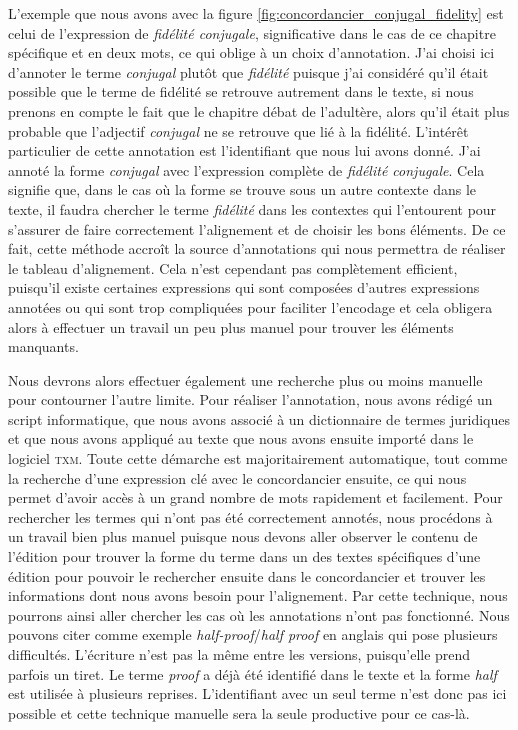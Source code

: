 L’exemple que nous avons avec la figure \ref{fig:concordancier_conjugal_fidelity} est celui de l’expression de \textit{fidélité conjugale}, significative dans le cas de ce chapitre spécifique et en deux mots, ce qui oblige à un choix d’annotation. J’ai choisi ici d’annoter le terme \textit{conjugal} plutôt que \textit{fidélité} puisque j’ai considéré qu’il était possible que le terme de fidélité se retrouve autrement dans le texte, si nous prenons en compte le fait que le chapitre débat de l’adultère, alors qu’il était plus probable que l’adjectif \textit{conjugal} ne se retrouve que lié à la fidélité. L’intérêt particulier de cette annotation est l’identifiant que nous lui avons donné. J’ai annoté la forme \textit{conjugal} avec l’expression complète de \textit{fidélité conjugale}. Cela signifie que, dans le cas où la forme se trouve sous un autre contexte dans le texte, il faudra chercher le terme \textit{fidélité} dans les contextes qui l’entourent pour s’assurer de faire correctement l’alignement et de choisir les bons éléments. De ce fait, cette méthode accroît la source d’annotations qui nous permettra de réaliser le tableau d’alignement. Cela n’est cependant pas complètement efficient, puisqu’il existe certaines expressions qui sont composées d’autres expressions annotées ou qui sont trop compliquées pour faciliter l’encodage et cela obligera alors à effectuer un travail un peu plus manuel pour trouver les éléments manquants.

Nous devrons alors effectuer également une recherche plus ou moins manuelle pour contourner l’autre limite. Pour réaliser l’annotation, nous avons rédigé un script informatique, que nous avons associé à un dictionnaire de termes juridiques et que nous avons appliqué au texte que nous avons ensuite importé dans le logiciel \textsc{txm}. Toute cette démarche est majoritairement automatique, tout comme la recherche d’une expression clé avec le concordancier ensuite, ce qui nous permet d’avoir accès à un grand nombre de mots rapidement et facilement. Pour rechercher les termes qui n’ont pas été correctement annotés, nous procédons à un travail bien plus manuel puisque nous devons aller observer le contenu de l’édition pour trouver la forme du terme dans un des textes spécifiques d’une édition pour pouvoir le rechercher ensuite dans le concordancier et trouver les informations dont nous avons besoin pour l’alignement. Par cette technique, nous pourrons ainsi aller chercher les cas où les annotations n’ont pas fonctionné. Nous pouvons citer comme exemple \textit{half-proof}/\textit{half proof} en anglais qui pose plusieurs difficultés. L’écriture n’est pas la même entre les versions, puisqu’elle prend parfois un tiret. Le terme \textit{proof} a déjà été identifié dans le texte et la forme \textit{half} est utilisée à plusieurs reprises. L’identifiant avec un seul terme n’est donc pas ici possible et cette technique manuelle sera la seule productive pour ce cas-là.

